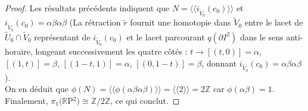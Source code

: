 \begin{proof}
    Les résultats précédents indiquent que $N=\langle\langle i_{\tilde{V}_0}(c_0)\rangle\rangle$ et $i_{\tilde{V}_0}(c_0)=\alpha\beta\alpha\beta$ (La rétraction $\tilde{r}$ fournit une homotopie dans $\tilde{V}_0$ entre le lacet de $\tilde{U}_0\cap\tilde{V}_0$ représentant de $i_{\tilde{V}_0}(c_0)$ et le lacet parcourant $q(\partial I^2)$ dans le sens anti-horaire, longeant successivement les quatre côtés : $t \to [(t,0)] = \alpha$, $[(1,t)] = \beta$, $[(1-t,1)] = \alpha$, $[(0,1-t)] = \beta$, donnant $i_{\tilde{V}_0}(c_0) = \alpha\beta\alpha\beta$).\medskip\\
    On en déduit que $\phi(N)=\langle\langle\phi(\alpha\beta\alpha\beta)\rangle\rangle=\langle\langle2\rangle\rangle=2\mathbb{Z}$ car $\phi(\alpha\beta)=1$.\medskip\\
    Finalement, $\pi_1(\mathbb{R}$P$^2)\cong\mathbb{Z}/2\mathbb{Z}$, ce qui conclut.
\end{proof}
